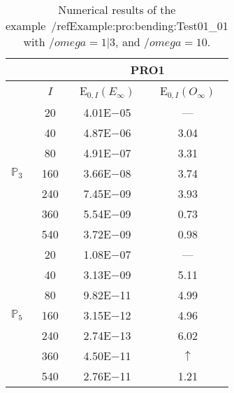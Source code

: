 \begin{table}[H]
\caption{Numerical results of the example~/ref{Example:pro:bending:Test01_01} with $/omega=1|3$, and $/omega=10$.}
\setlength{\tabcolsep}{5pt}
\centering
\begin{tabular}{@{}l c c c@{}}
\toprule
 &  & \multicolumn{2}{c}{PRO1}\\
\midrule
 & $I$ & E$_{0,I}(E_{\infty})$ & E$_{0,I}(O_{\infty})$\\
\midrule
\multirow{7}{*}{$\mathbb{P}_{3}$}
 & 20 & 4.01E$-$05 & ---\\
 & 40 & 4.87E$-$06 & 3.04\\
 & 80 & 4.91E$-$07 & 3.31\\
 & 160 & 3.66E$-$08 & 3.74\\
 & 240 & 7.45E$-$09 & 3.93\\
 & 360 & 5.54E$-$09 & 0.73\\
 & 540 & 3.72E$-$09 & 0.98\\
\midrule
\multirow{7}{*}{$\mathbb{P}_{5}$}
 & 20 & 1.08E$-$07 & ---\\
 & 40 & 3.13E$-$09 & 5.11\\
 & 80 & 9.82E$-$11 & 4.99\\
 & 160 & 3.15E$-$12 & 4.96\\
 & 240 & 2.74E$-$13 & 6.02\\
 & 360 & 4.50E$-$11 & $\uparrow$\\
 & 540 & 2.76E$-$11 & 1.21\\
\bottomrule
\end{tabular}
\label{Table:pRO:test_01_01_test8_pro3}
\end{table}
